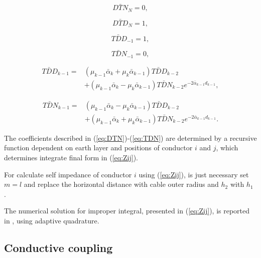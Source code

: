 \documentclass{IEEEtran4PSCC}
\begin{document}
\begin{equation}
	D\bar{T}N_{N} = 0,
\end{equation}

\begin{equation}
	D\bar{T}D_{N} = 1,
\end{equation}

\begin{equation}
	T\bar{D}D_{-1} = 1,
\end{equation}

\begin{equation}
	T\bar{D}N_{-1} = 0,
\end{equation}

\begin{equation}
	\begin{aligned}
		T\bar{D}D_{k-1} = {} & (\mu_{k-1}\bar\alpha_{k} + \mu_{k}\bar\alpha_{k-1})T\bar{D}D_{k-2} \\
		& + (\mu_{k-1}\bar\alpha_{k} - \mu_{k}\bar\alpha_{k-1})T\bar{D}N_{k-2}e^{-2\bar\alpha_{k-1}d_{k-1}},
	\end{aligned}
\end{equation} 

\begin{equation}\label{eq:TDN}
	\begin{aligned}
		T\bar{D}N_{k-1} = {} & (\mu_{k-1}\bar\alpha_{k} - \mu_{k}\bar\alpha_{k-1})T\bar{D}D_{k-2} \\
		& + (\mu_{k-1}\bar\alpha_{k} + \mu_{k}\bar\alpha_{k-1})T\bar{D}N_{k-2}e^{-2\bar\alpha_{k-1}d_{k-1}}.
	\end{aligned}
\end{equation}




The coefficients described in (\ref{eq:DTN})-(\ref{eq:TDN}) are determined by a recursive function dependent on earth layer and positions of conductor $i$ and $j$, which determines integrate final form in (\ref{eq:Zij}). 

For calculate self impedance of conductor $i$ using (\ref{eq:Zij}), is just necessary set $m = l$ and replace the horizontal distance with cable outer radius and $h_{2}$ with $h_{1}$ \cite{Tsiamitros2008a}.

The numerical solution for improper integral, presented in (\ref{eq:Zij}), is reported in \cite{Shampine2008}, using adaptive quadrature.



\subsection{Conductive coupling}
\end{document}
